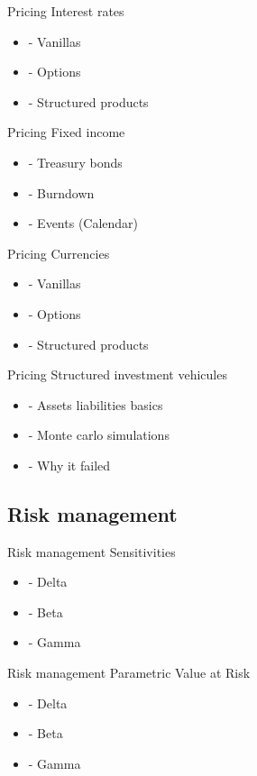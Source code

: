 \documentclass{beamer}
\begin{document}
\begin{frame}{Pricing}
Interest rates
  \begin{itemize}
  \item
- Vanillas 
  \item
- Options 
  \item
- Structured products 
  \end{itemize}
\end{frame}

\begin{frame}{Pricing}
Fixed income
 \begin{itemize}
  \item
- Treasury bonds 
  \item
- Burndown
  \item
- Events (Calendar)
  \end{itemize}
\end{frame}

\begin{frame}{Pricing}
Currencies
  \begin{itemize}
  \item
- Vanillas 
  \item
- Options 
  \item
- Structured products 
  \end{itemize}
\end{frame}

\begin{frame}{Pricing}
Structured investment vehicules
  \begin{itemize}
  \item
- Assets liabilities basics 
  \item
- Monte carlo simulations 
  \item
- Why it failed 
  \end{itemize}
\end{frame}

\subsection{Risk management}
\begin{frame}{Risk management}
Sensitivities
  \begin{itemize}
  \item
- Delta 
  \item
- Beta 
  \item
- Gamma 
  \end{itemize}
\end{frame}

\begin{frame}{Risk management}
Parametric Value at Risk
  \begin{itemize}
  \item
- Delta 
  \item
- Beta 
  \item
- Gamma 
  \end{itemize}
\end{frame}
\end{document}
